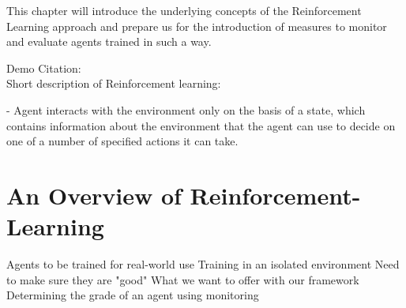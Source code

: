 \begin{jointwork}
	This chapter will introduce the underlying concepts of the Reinforcement Learning approach and prepare us for the introduction of measures to monitor and evaluate agents trained in such a way.
\end{jointwork}

Demo Citation: \cite{reinforcementLearningOverview} \\

Short description of Reinforcement learning:

- Agent interacts with the environment only on the basis of a state, which contains information about the 
environment that the agent can use to decide on one of a number of specified actions it can take.

\section{An Overview of Reinforcement-Learning}


Agents to be trained for real-world use
Training in an isolated environment
Need to make sure they are "good"
What we want to offer with our framework
Determining the grade of an agent using monitoring